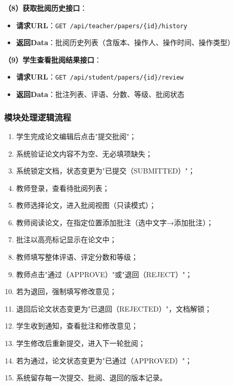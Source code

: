 \documentclass{../template/softeng}
\begin{document}
	\textbf{（8）获取批阅历史接口}：
	\begin{itemize}
		\item \textbf{请求URL}：\texttt{GET /api/teacher/papers/\{id\}/history}
		\item \textbf{返回Data}：批阅历史列表（含版本、操作人、操作时间、操作类型）
	\end{itemize}

	\textbf{（9）学生查看批阅结果接口}：
	\begin{itemize}
		\item \textbf{请求URL}：\texttt{GET /api/student/papers/\{id\}/review}
		\item \textbf{返回Data}：批注列表、评语、分数、等级、批阅状态
	\end{itemize}

	\subsubsection{模块处理逻辑流程}
	\begin{enumerate}
		\item 学生完成论文编辑后点击"提交批阅"；
		\item 系统验证论文内容不为空、无必填项缺失；
		\item 系统锁定文档，状态变更为"已提交（SUBMITTED）"；
		\item 教师登录，查看待批阅列表；
		\item 教师选择论文，进入批阅视图（只读模式）；
		\item 教师阅读论文，在指定位置添加批注（选中文字→添加批注）；
		\item 批注以高亮标记显示在论文中；
		\item 教师填写整体评语、评定分数和等级；
		\item 教师点击"通过（APPROVE）"或"退回（REJECT）"；
		\item 若为退回，强制填写修改意见；
		\item 退回后论文状态变更为"已退回（REJECTED）"，文档解锁；
		\item 学生收到通知，查看批注和修改意见；
		\item 学生修改后重新提交，进入下一轮批阅；
		\item 若为通过，论文状态变更为"已通过（APPROVED）"；
		\item 系统留存每一次提交、批阅、退回的版本记录。
	\end{enumerate}
\end{document}
